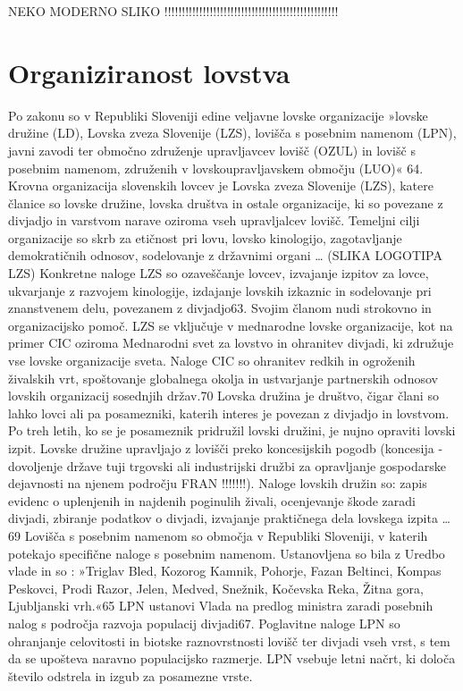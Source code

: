 \documentclass[a4paper,12pt,openright]{book}
\begin{document}
NEKO MODERNO SLIKO !!!!!!!!!!!!!!!!!!!!!!!!!!!!!!!!!!!!!!!!!!!!!!!!!!

\section{Organiziranost lovstva}

Po zakonu so v Republiki Sloveniji edine veljavne lovske organizacije »lovske družine (LD), Lovska zveza Slovenije (LZS), lovišča s posebnim namenom (LPN), javni zavodi ter območno združenje upravljavcev lovišč (OZUL) in lovišč s posebnim namenom, združenih v lovskoupravljavskem območju (LUO)« {64}. 
Krovna organizacija slovenskih lovcev je Lovska zveza Slovenije (LZS), katere članice so lovske družine, lovska društva in ostale organizacije, ki so povezane z divjadjo in varstvom narave oziroma vseh upravljalcev lovišč. 
Temeljni cilji organizacije so skrb za etičnost pri lovu, lovsko kinologijo, zagotavljanje demokratičnih odnosov, sodelovanje z državnimi organi … 
(SLIKA LOGOTIPA LZS)
Konkretne naloge LZS so ozaveščanje lovcev, izvajanje izpitov za lovce, ukvarjanje z razvojem kinologije, izdajanje lovskih izkaznic in sodelovanje pri znanstvenem delu, povezanem z divjadjo{63}. 
Svojim članom nudi strokovno in organizacijsko pomoč. 
LZS se vključuje v mednarodne lovske organizacije, kot na primer CIC oziroma Mednarodni svet za lovstvo in ohranitev divjadi, ki združuje vse lovske organizacije sveta.
Naloge CIC so ohranitev redkih in ogroženih živalskih vrt, spoštovanje globalnega okolja in ustvarjanje partnerskih odnosov lovskih organizacij sosednjih držav.{70} 
Lovska družina je društvo, čigar člani so lahko lovci ali pa posamezniki, katerih interes je povezan z divjadjo in lovstvom. 
Po treh letih, ko se je posameznik pridružil lovski družini, je nujno opraviti lovski izpit.
Lovske družine upravljajo z lovišči preko koncesijskih pogodb (koncesija - dovoljenje države tuji trgovski ali industrijski družbi za opravljanje gospodarske dejavnosti na njenem področju FRAN !!!!!!!).
Naloge lovskih družin so: zapis evidenc o uplenjenih in najdenih poginulih živali, ocenjevanje škode zaradi divjadi, zbiranje podatkov o divjadi, izvajanje praktičnega dela lovskega izpita …{69} 
Lovišča s posebnim namenom so območja v Republiki Sloveniji, v katerih potekajo specifične naloge s posebnim namenom.
Ustanovljena so bila z Uredbo vlade in so : »Triglav Bled, Kozorog Kamnik, Pohorje, Fazan Beltinci, Kompas Peskovci, Prodi Razor, Jelen, Medved, Snežnik, Kočevska Reka, Žitna gora, Ljubljanski vrh.«{65}
LPN ustanovi Vlada na predlog ministra zaradi posebnih nalog s področja razvoja populacij divjadi{67}. 
Poglavitne naloge LPN so ohranjanje celovitosti in biotske raznovrstnosti lovišč ter divjadi vseh vrst, s tem da se upošteva naravno populacijsko razmerje. 
LPN vsebuje letni načrt, ki določa število odstrela in izgub za posamezne vrste.\cite{Div_63_71}
\end{document}
